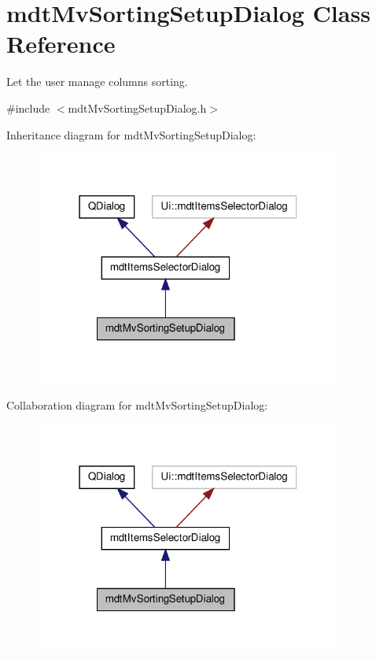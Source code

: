 \hypertarget{classmdt_mv_sorting_setup_dialog}{\section{mdt\-Mv\-Sorting\-Setup\-Dialog Class Reference}
\label{classmdt_mv_sorting_setup_dialog}
}


Let the user manage columns sorting.  




{\ttfamily \#include $<$mdt\-Mv\-Sorting\-Setup\-Dialog.\-h$>$}



Inheritance diagram for mdt\-Mv\-Sorting\-Setup\-Dialog\-:
\nopagebreak
\begin{figure}[H]
\begin{center}
\leavevmode
\includegraphics[width=286pt]{classmdt_mv_sorting_setup_dialog__inherit__graph}
\end{center}
\end{figure}


Collaboration diagram for mdt\-Mv\-Sorting\-Setup\-Dialog\-:
\nopagebreak
\begin{figure}[H]
\begin{center}
\leavevmode
\includegraphics[width=286pt]{classmdt_mv_sorting_setup_dialog__coll__graph}
\end{center}
\end{figure}
